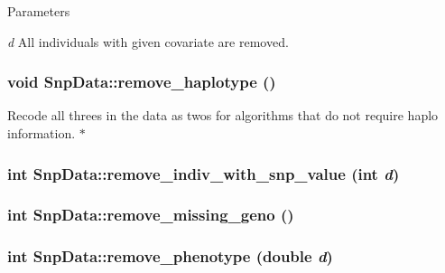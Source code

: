 \begin{DoxyParams}{Parameters}
\item[{\em d}]All individuals with given covariate are removed. \end{DoxyParams}
\hypertarget{classSnpData_a6c174381b8ca1a605e7e052990b563ce}{
\subsubsection[{remove\_\-haplotype}]{\setlength{\rightskip}{0pt plus 5cm}void SnpData::remove\_\-haplotype ()}}
\label{classSnpData_a6c174381b8ca1a605e7e052990b563ce}
Recode all threes in the data as twos for algorithms that do not require haplo information. $\ast$ \hypertarget{classSnpData_ac7952b0c911c5c3f7a894ab3c5b9c179}{
\subsubsection[{remove\_\-indiv\_\-with\_\-snp\_\-value}]{\setlength{\rightskip}{0pt plus 5cm}int SnpData::remove\_\-indiv\_\-with\_\-snp\_\-value (int {\em d})}}
\label{classSnpData_ac7952b0c911c5c3f7a894ab3c5b9c179}
\hypertarget{classSnpData_afadaf2a77dc7b57c53c35bfda981bbc8}{
\subsubsection[{remove\_\-missing\_\-geno}]{\setlength{\rightskip}{0pt plus 5cm}int SnpData::remove\_\-missing\_\-geno ()}}
\label{classSnpData_afadaf2a77dc7b57c53c35bfda981bbc8}
\hypertarget{classSnpData_a0056036c39385fa3e2955162755be872}{
\subsubsection[{remove\_\-phenotype}]{\setlength{\rightskip}{0pt plus 5cm}int SnpData::remove\_\-phenotype (double {\em d})}}
\label{classSnpData_a0056036c39385fa3e2955162755be872}
